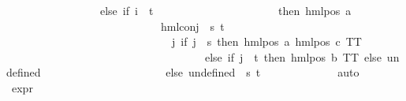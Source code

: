 \begin{isabellebody}
\ \ \ \ \ \ \ \ \ \ \ \ \ \ \ \ \ else\ if\ i\ {\isacharequal}{\kern0pt}\ t\isanewline
\ \ \ \ \ \ \ \ \ \ \ \ \ \ \ \ \ \ \ \ \ \ then\ hml{\isacharunderscore}{\kern0pt}pos\ a\isanewline
\ \ \ \ \ \ \ \ \ \ \ \ \ \ \ \ \ \ \ \ \ \ \ \ \ \ \ \ {\isacharparenleft}{\kern0pt}hml{\isacharunderscore}{\kern0pt}conj\ {\isacharbraceleft}{\kern0pt}{\isacharbraceright}{\kern0pt}\ {\isacharbraceleft}{\kern0pt}s{\isacharcomma}{\kern0pt}\ t{\isacharbraceright}{\kern0pt}\isanewline
\ \ \ \ \ \ \ \ \ \ \ \ \ \ \ \ \ \ \ \ \ \ \ \ \ \ \ \ \ \ {\isacharparenleft}{\kern0pt}{\isasymlambda}j{\isachardot}{\kern0pt}\ if\ j\ {\isacharequal}{\kern0pt}\ s\ then\ hml{\isacharunderscore}{\kern0pt}pos\ a\ {\isacharparenleft}{\kern0pt}hml{\isacharunderscore}{\kern0pt}pos\ c\ TT{\isacharparenright}{\kern0pt}\isanewline
\ \ \ \ \ \ \ \ \ \ \ \ \ \ \ \ \ \ \ \ \ \ \ \ \ \ \ \ \ \ \ \ \ \ \ \ else\ if\ j\ {\isacharequal}{\kern0pt}\ t\ then\ hml{\isacharunderscore}{\kern0pt}pos\ b\ TT\ else\ undefined{\isacharparenright}{\kern0pt}{\isacharparenright}{\kern0pt}\isanewline
\ \ \ \ \ \ \ \ \ \ \ \ \ \ \ \ \ \ \ \ \ \ else\ undefined{\isacharparenright}{\kern0pt}\ {\isacharbackquote}{\kern0pt}\ {\isacharbraceleft}{\kern0pt}s{\isacharcomma}{\kern0pt}\ t{\isacharbraceright}{\kern0pt}{\isacharparenright}{\kern0pt}{\isacharparenright}{\kern0pt}{\isacharparenright}{\kern0pt}{\isacharparenright}{\kern0pt}\ {\isacharequal}{\kern0pt}\ {}{\isachardoublequoteclose}\ \isanewline
\ \ \ \ \ \ \isamarkupfalse%
\ {\isachardoublequoteopen}{}{\isachardoublequoteclose}\ \isamarkupfalse%
\ auto\isanewline
\ \ \ \ \isamarkupfalse%
\ \isamarkupfalse%
\ {\isachardoublequoteopen}expr{\isacharunderscore}{\kern0pt}{}\ {\isasymphi}\ {\isacharequal}{\kern0pt}\ {}{\isachardoublequoteclose}\ \isanewline
\ \ \ \ \ \ \isamarkupfalse%
\ {\isasymphi}\isanewline
\ \ \ \ \ \ \isamarkupfalse%

\end{isabellebody}
